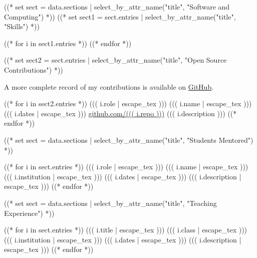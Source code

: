 \documentclass[10pt, letterpaper]{awesome-cv}
\begin{document}
((* set sect = data.sections | select_by_attr_name("title", "Software and Computing") *))
((* set sect1 = sect.entries | select_by_attr_name("title", "Skills") *))
\begin{cvskills}
((* for i in sect1.entries *))
((* endfor *))
\end{cvskills}
((* set sect2 = sect.entries | select_by_attr_name("title", "Open Source Contributions") *))

A more complete record of my contributions is available on 
\href{https://github.com/((( data.preamble.contact.github )))}
     {GitHub}.
\begin{cventries}
((* for i in sect2.entries *))
\cventry
  {((( i.role | escape_tex )))}
  {((( i.name | escape_tex )))}
  {((( i.dates | escape_tex )))}
  {\href{https://github.com/((( i.repo )))}{github.com/((( i.repo )))}}
  {((( i.description )))}
((* endfor *))
\end{cventries}

((* set sect = data.sections | select_by_attr_name("title", "Students Mentored") *))
\begin{cventries}
((* for i in sect.entries *))
\cventry
  {((( i.role | escape_tex )))}
  {((( i.name | escape_tex )))}
  {((( i.institution | escape_tex )))}
  {((( i.dates | escape_tex )))}
  {((( i.description | escape_tex )))}
((* endfor *))
\end{cventries}
((* set sect = data.sections | select_by_attr_name("title", "Teaching Experience") *))
\begin{cventries}
((* for i in sect.entries *))
\cventry
  {((( i.title | escape_tex )))}
  {((( i.class | escape_tex )))}
  {((( i.institution | escape_tex )))}
  {((( i.dates | escape_tex )))}
  {((( i.description | escape_tex )))}
((* endfor *))
\end{cventries}
\end{document}
